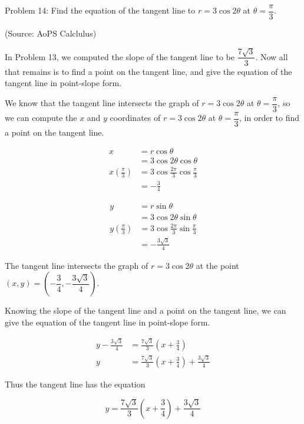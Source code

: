 Problem 14: Find the equation of the tangent line to $r = 3 \cos 2\theta$ at $\theta = \dfrac{\pi}{3}$.

(Source: AoPS Calclulus)

In Problem 13, we computed the slope of the tangent line to be $\dfrac{7 \sqrt 3}{3}$. Now all that remains is to find a point on the tangent line, and give the equation of the tangent line in point-slope form.

We know that the tangent line intersects the graph of $r = 3 \cos 2\theta$ at $\theta = \dfrac{\pi}{3}$, so we can compute the $x$ and $y$ coordinates of $r = 3 \cos 2\theta$ at $\theta = \dfrac{\pi}{3}$, in order to find a point on the tangent line.

\begin{align*}
x &= r \cos \theta \\
&= 3 \cos 2\theta \cos \theta \\
x\left(\frac{\pi}{3}\right) &= 3 \cos \frac{2\pi}{3} \cos \frac{\pi}{3} \\
&= -\frac{3}{4}
\end{align*}

\begin{align*}
y &= r \sin \theta \\
&= 3 \cos 2\theta \sin \theta \\
y\left(\frac{\pi}{3}\right) &= 3 \cos \frac{2\pi}{3} \sin \frac{\pi}{3} \\
&= -\frac{3\sqrt3}{4}
\end{align*}

The tangent line intersects the graph of $r = 3 \cos 2\theta$ at the point $\left(x, y\right) = \left(-\dfrac{3}{4}, -\dfrac{3\sqrt3}{4}\right)$.

Knowing the slope of the tangent line and a point on the tangent line, we can give the equation of the tangent line in point-slope form.

\begin{align*}
y - \frac{3\sqrt3}{4} &= \frac{7 \sqrt 3}{3} \left(x + \frac{3}{4}\right) \\
y &= \frac{7 \sqrt 3}{3} \left(x + \frac{3}{4}\right) + \frac{3\sqrt3}{4}
\end{align*}

Thus the tangent line has the equation

$$ \boxed{y = \frac{7 \sqrt 3}{3} \left(x + \frac{3}{4}\right) + \frac{3\sqrt3}{4}} $$
